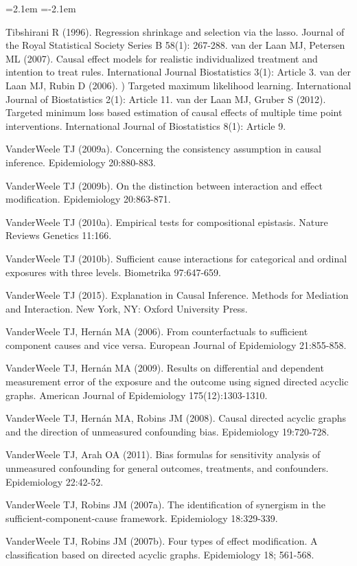 \begin{list}{}{\leftmargin=2.1em   \itemindent=-2.1em \parsep=0pt \itemsep=1.6pt \topsep=4pt \rightmargin=0pt}
\item Tibshirani R (1996). Regression shrinkage and selection via the lasso. Journal of the Royal Statistical Society Series B 58(1): 267-288. van der Laan MJ, Petersen ML (2007). Causal effect models for realistic individualized treatment and intention to treat rules. International Journal Biostatistics 3(1): Article 3. van der Laan MJ, Rubin D (2006). ) Targeted maximum likelihood learning. International Journal of Biostatistics 2(1): Article 11. van der Laan MJ, Gruber S (2012). Targeted minimum loss based estimation of causal effects of multiple time point interventions. International Journal of Biostatistics 8(1): Article 9.
\item VanderWeele TJ (2009a). Concerning the consistency assumption in causal inference. Epidemiology 20:880-883.
\item VanderWeele TJ (2009b). On the distinction between interaction and effect modification. Epidemiology 20:863-871.
\item VanderWeele TJ (2010a). Empirical tests for compositional epistasis. Nature Reviews Genetics 11:166.
\item VanderWeele TJ (2010b). Sufficient cause interactions for categorical and ordinal exposures with three levels. Biometrika 97:647-659.
\item VanderWeele TJ (2015). Explanation in Causal Inference. Methods for Mediation and Interaction. New York, NY: Oxford University Press.
\item VanderWeele TJ, Hernán MA (2006). From counterfactuals to sufficient component causes and vice versa. European Journal of Epidemiology 21:855-858.
\item VanderWeele TJ, Hernán MA (2009). Results on differential and dependent measurement error of the exposure and the outcome using signed directed acyclic graphs. American Journal of Epidemiology 175(12):1303-1310.
\item VanderWeele TJ, Hernán MA, Robins JM (2008). Causal directed acyclic graphs and the direction of unmeasured confounding bias. Epidemiology 19:720-728.
\item VanderWeele TJ, Arah OA (2011). Bias formulas for sensitivity analysis of unmeasured confounding for general outcomes, treatments, and confounders. Epidemiology 22:42-52.
\item VanderWeele TJ, Robins JM (2007a). The identification of synergism in the sufficient-component-cause framework. Epidemiology 18:329-339.
\item VanderWeele TJ, Robins JM (2007b). Four types of effect modification. A classification based on directed acyclic graphs. Epidemiology 18; 561-568.

\end{list}
